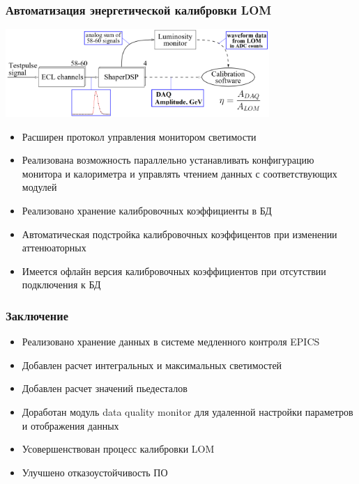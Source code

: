 \documentclass{beamer}
\begin{document}
\begin{frame}
\frametitle{Автоматизация энергетической калибровки LOM}
  \begin{center}
  \includegraphics[width=0.75\textwidth, height=0.3\textheight]{calibration.png}
  \end{center}
  \begin{itemize}
    \item Расширен протокол управления монитором светимости
    \item Реализована возможность параллельно устанавливать конфигурацию монитора и калориметра и управлять чтением данных с соответствующих модулей
    \item Реализовано хранение калибровочных коэффициенты в БД
    \item Автоматическая подстройка калибровочных коэффицентов при изменении аттенюаторных
    \item Имеется офлайн версия калибровочных коэффициентов при отсутствии подключения к БД
  \end{itemize}
\end{frame}

\begin{frame}
\frametitle{Заключение}
  \begin{itemize}
    \item Реализовано хранение данных в системе медленного контроля EPICS
    \item Добавлен расчет интегральных и максимальных светимостей
    \item Добавлен расчет значений пьедесталов
    \item Доработан модуль data quality monitor для удаленной настройки параметров и отображения данных
    \item Усовершенствован процесс калибровки LOM
    \item Улучшено отказоустойчивость ПО
  \end{itemize}
\end{frame}
\end{document}
